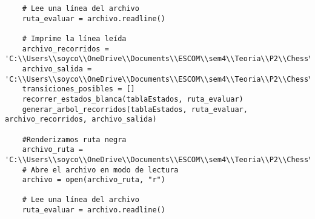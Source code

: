 \begin{enumerate}
\begin{lstlisting}
    # Lee una línea del archivo
    ruta_evaluar = archivo.readline()

    # Imprime la línea leída
    archivo_recorridos = 'C:\\Users\\soyco\\OneDrive\\Documents\\ESCOM\\sem4\\Teoria\\P2\\Chess\\output\\recorridos_blanca.txt'
    archivo_salida = 'C:\\Users\\soyco\\OneDrive\\Documents\\ESCOM\\sem4\\Teoria\\P2\\Chess\\output\\arbol_blanca.dot'
    transiciones_posibles = []
    recorrer_estados_blanca(tablaEstados, ruta_evaluar)
    generar_arbol_recorridos(tablaEstados, ruta_evaluar, archivo_recorridos, archivo_salida)
    
    #Renderizamos ruta negra
    archivo_ruta = 'C:\\Users\\soyco\\OneDrive\\Documents\\ESCOM\\sem4\\Teoria\\P2\\Chess\\output\\ruta_negra.txt'
    # Abre el archivo en modo de lectura
    archivo = open(archivo_ruta, "r")

    # Lee una línea del archivo
    ruta_evaluar = archivo.readline()


\end{lstlisting}
\end{enumerate}
